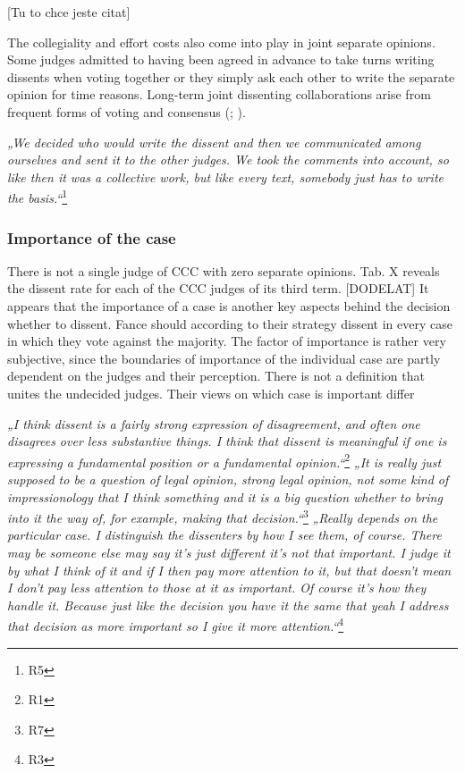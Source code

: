 \documentclass[
  11pt,
]{article}
\begin{document}
{[}Tu to chce jeste citat{]}

The collegiality and effort costs also come into play in joint separate opinions. Some judges admitted to having been agreed in advance to take turns writing dissents when voting together or they simply ask each other to write the separate opinion for time reasons. Long-term joint dissenting collaborations arise from frequent forms of voting and consensus (; ).

\emph{„We decided who would write the dissent and then we communicated among ourselves and sent it to the other judges. We took the comments into account, so like then it was a collective work, but like every text, somebody just has to write the basis.``}\footnote{R5}

\subsubsection{Importance of the case}\label{importance-of-the-case}

There is not a single judge of CCC with zero separate opinions. Tab. X reveals the dissent rate for each of the CCC judges of its third term. {[}DODELAT{]}
It appears that the importance of a case is another key aspects behind the decision whether to dissent. Fance should according to their strategy dissent in every case in which they vote against the majority. The factor of importance is rather very subjective, since the boundaries of importance of the individual case are partly dependent on the judges and their perception. There is not a definition that unites the undecided judges. Their views on which case is important differ

\emph{„I think dissent is a fairly strong expression of disagreement, and often one disagrees over less substantive things. I think that dissent is meaningful if one is expressing a fundamental position or a fundamental opinion.``}\footnote{R1}
\emph{„It is really just supposed to be a question of legal opinion, strong legal opinion, not some kind of impressionology that I think something and it is a big question whether to bring into it the way of, for example, making that decision.``}\footnote{R7}
\emph{„Really depends on the particular case. I distinguish the dissenters by how I see them, of course. There may be someone else may say it's just different it's not that important. I judge it by what I think of it and if I then pay more attention to it, but that doesn't mean I don't pay less attention to those at it as important. Of course it's how they handle it. Because just like the decision you have it the same that yeah I address that decision as more important so I give it more attention.``}\footnote{R3}
\end{document}
